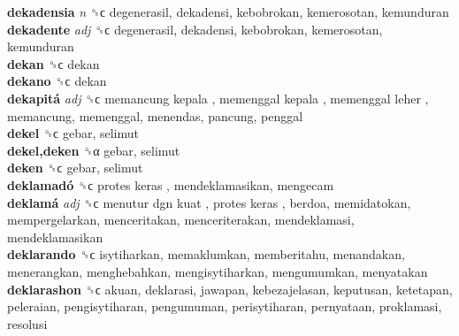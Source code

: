 \textbf{dekadensia} \emph{n}  ␝ϲ  degenerasil, dekadensi, kebobrokan, kemerosotan, kemunduran  \\
\textbf{dekadente} \emph{adj}  ␝ϲ  degenerasil, dekadensi, kebobrokan, kemerosotan, kemunduran  \\
\textbf{dekan} ␝ϲ  dekan  \\
\textbf{dekano} ␝ϲ  dekan  \\
\textbf{dekapitá} \emph{adj}  ␝ϲ   memancung kepala ,  memenggal kepala ,  memenggal leher , memancung, memenggal, menendas, pancung, penggal  \\
\textbf{dekel} ␝ϲ  gebar, selimut  \\
\textbf{dekel,deken} ␝α  gebar, selimut  \\
\textbf{deken} ␝ϲ  gebar, selimut  \\
\textbf{deklamadó} ␝ϲ   protes keras , mendeklamasikan, mengecam  \\
\textbf{deklamá} \emph{adj}  ␝ϲ   menutur dgn kuat ,  protes keras , berdoa, memidatokan, mempergelarkan, menceritakan, menceriterakan, mendeklamasi, mendeklamasikan  \\
\textbf{deklarando} ␝ϲ  isytiharkan, memaklumkan, memberitahu, menandakan, menerangkan, menghebahkan, mengisytiharkan, mengumumkan, menyatakan  \\
\textbf{deklarashon} ␝ϲ  akuan, deklarasi, jawapan, kebezajelasan, keputusan, ketetapan, peleraian, pengisytiharan, pengumuman, perisytiharan, pernyataan, proklamasi, resolusi  \\
